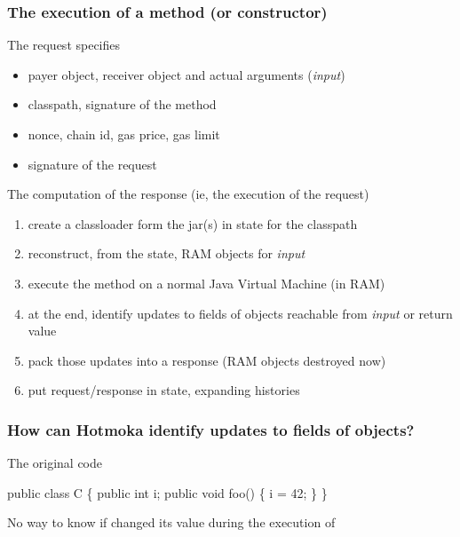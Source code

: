 \documentclass[11pt]{beamer}  %
\def\codesize{\smaller}
\def\<#1>{\codeid{#1}}
\newcommand{\codeid}[1]{\ifmmode{\mbox{\codesize\ttfamily{#1}}}\else{\codesize\ttfamily #1}\fi}
\begin{document}
\begin{frame}\frametitle{The execution of a method (or constructor)}

  \begin{greenbox}{The request specifies}
    \begin{itemize}
    \item payer object, receiver object and actual arguments (\emph{input})
    \item classpath, signature of the method
    \item nonce, chain id, gas price, gas limit
    \item signature of the request
    \end{itemize}
  \end{greenbox}

  \bigskip

  \begin{greenbox}{The computation of the response (ie, the execution of the request)}
    \begin{enumerate}
    \item create a classloader form the jar(s) in state for the classpath
    \item reconstruct, from the state, RAM objects for \emph{input}
    \item execute the method on a normal Java Virtual Machine (in RAM)
    \item at the end, identify updates to fields of objects reachable from \emph{input}
      or return value
    \item pack those updates into a response (RAM objects destroyed now)
    \item put request/response in state, expanding histories
    \end{enumerate}
  \end{greenbox}

\end{frame}

\begin{frame}[fragile]\frametitle{How can Hotmoka identify updates to fields of objects?}

  \begin{greenbox}{The original code}
    \begin{semiverbatim}
      public class C \{
        public {\color{blue}int i;}
        public void foo() \{
          {\color{blue}i} = 42;
        \}
      \}
    \end{semiverbatim}
  \end{greenbox}

  \begin{center}
    No way to know if \<i> changed its value during the execution of \<foo()>
  \end{center}

\end{frame}
\end{document}
